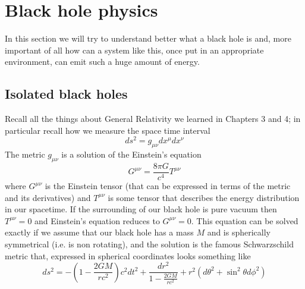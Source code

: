 \documentclass[11pt, a4paper,oneside,openright]{book}
\numberwithin{equation}{section}
\begin{document}
\section{Black hole physics}
In this section we will try to understand better what a black hole is and, more important of all how can a system like this, once put in an appropriate environment, can emit such a huge amount of energy. 
\subsection{Isolated black holes}
Recall all the things about General Relativity we learned in Chapters 3 and 4; in particular recall how we measure the space time interval
\begin{equation}
ds^2 = g_{\mu\nu}dx^\mu dx^\nu
\end{equation}
The metric $g_{\mu\nu}$ is a solution of the Einstein's equation
\begin{equation}
G^{\mu\nu}=\frac{8\pi G}{c^4}T^{\mu\nu}
\end{equation}
where $G^{\mu\nu}$ is the Einstein tensor (that can be expressed in terms of the metric and its derivatives) and $T^{\mu\nu}$ is some tensor that describes the energy distribution in our spacetime. If the surrounding of our black hole is pure vacuum then $T^{\mu\nu}=0$ and Einstein's equation reduces to $G^{\mu\nu}=0$. This equation can be solved exactly if we assume that our black hole has a mass $M$ and is spherically symmetrical (i.e. is non rotating), and the solution is the famous Schwarzschild metric that, expressed in spherical coordinates looks something like
\begin{equation}
ds^2=-\left(1-\frac{2GM}{rc^2}\right)c^2dt^2 + \frac{dr^2}{1-\frac{2GM}{rc^2}} + r^2(d\theta^2+\sin^2\theta d\phi^2)
\end{equation}
\end{document}
